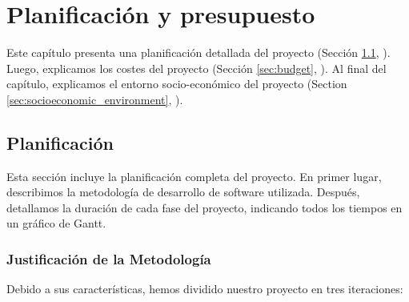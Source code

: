 \chead[]{}
\renewcommand{\headrulewidth}{0.5pt}

\lfoot[]{}
\cfoot[]{}
\rfoot[]{}
\renewcommand{\footrulewidth}{0pt}

\chapter{Planificación y presupuesto}
\label{ch:planning_and_budget}

Este capítulo presenta una planificación detallada del proyecto (Sección \ref{sec:planning}, \textit{}). Luego, explicamos los costes del proyecto (Sección \ref{sec:budget}, \textit{}). Al final del capítulo, explicamos el entorno socio-económico del proyecto ({Section \ref{sec:socioeconomic_environment}, \textit{}}).

\section{Planificación}
\label{sec:planning}

Esta sección incluye la planificación completa del proyecto. En primer lugar, describimos la metodología de desarrollo de software utilizada. Después, detallamos la duración de cada fase del proyecto, indicando todos los tiempos en un gráfico de Gantt.

\subsection{Justificación de la Metodología}

Debido a sus características, hemos dividido nuestro proyecto en tres iteraciones:

